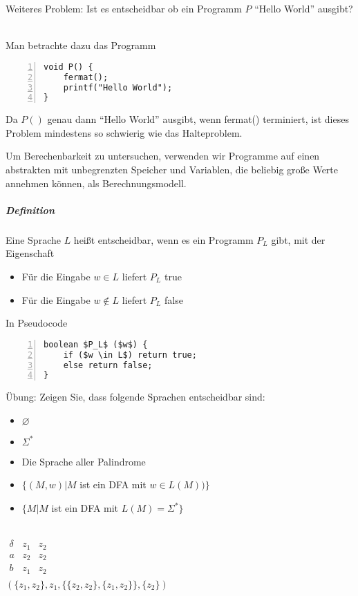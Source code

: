 \documentclass[a4paper]{scrartcl}
\begin{document}
Weiteres Problem: Ist es entscheidbar ob ein Programm $P$ "`Hello World"' ausgibt?\\
\\
Man betrachte dazu das Programm
\begin{lstlisting}[numbers=left, tabsize=4, style=customc]
void P() {
    fermat();
    printf("Hello World");
}
\end{lstlisting}
Da $P()$ genau dann "`Hello World"' ausgibt, wenn fermat() terminiert, ist dieses Problem mindestens so schwierig wie das Halteproblem.

Um Berechenbarkeit zu untersuchen, verwenden wir Programme auf einen abstrakten mit unbegrenzten Speicher und Variablen, die beliebig große Werte annehmen können, als Berechnungsmodell.

\subparagraph{Definition} Eine Sprache $L$ heißt entscheidbar, wenn es ein Programm $P_L$ gibt, mit der Eigenschaft
\begin{itemize}
\item Für die Eingabe $w \in L$ liefert $P_L$ true
\item Für die Eingabe $w \notin L$ liefert $P_L$ false
\end{itemize}
In Pseudocode
\begin{lstlisting}[numbers=left, tabsize=4, style=customc,mathescape]
boolean $P_L$ ($w$) {
    if ($w \in L$) return true;
    else return false;
}
\end{lstlisting}

Übung: Zeigen Sie, dass folgende Sprachen entscheidbar sind:
\begin{itemize}
\item $\varnothing$
\item $\Sigma^*$
\item Die Sprache aller Palindrome
\item $\{ (M,w) | M$ ist ein DFA mit $w \in L(M))\}$
\item $\{M | M$ ist ein DFA mit $L(M) = \Sigma^*\}$
\end{itemize}
\\
$\begin{array}{c|cc}
\delta & z_1 & z_2 \\ \hline
a & z_2 & z_2 \\
b & z_1 & z_2 \\
\end{array}$\\
$(\{z_1,z_2\},z_1,\{\{z_2,z_2\},\{z_1,z_2\}\}, \{z_2\})$
\end{document}
